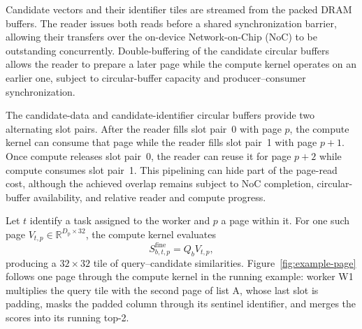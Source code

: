 Candidate vectors and their identifier tiles are streamed from the packed DRAM buffers. The reader issues both reads before a shared synchronization barrier, allowing their transfers over the on-device Network-on-Chip (NoC) to be outstanding concurrently. Double-buffering of the candidate circular buffers allows the reader to prepare a later page while the compute kernel operates on an earlier one, subject to circular-buffer capacity and producer--consumer synchronization.

The candidate-data and candidate-identifier circular buffers provide two alternating slot pairs. After the reader fills slot pair~0 with page \(p\), the compute kernel can consume that page while the reader fills slot pair~1 with page \(p+1\). Once compute releases slot pair~0, the reader can reuse it for page \(p+2\) while compute consumes slot pair~1. This pipelining can hide part of the page-read cost, although the achieved overlap remains subject to NoC completion, circular-buffer availability, and relative reader and compute progress.


Let \(t\) identify a task assigned to the worker and \(p\) a page within it. For one such page \(V_{t,p}\in\mathbb{R}^{D_{\mathrm{p}}\times32}\), the compute kernel evaluates
\begin{equation}
S^{\mathrm{fine}}_{b,t,p}=Q_bV_{t,p},
\label{eq:fine-search}
\end{equation}
producing a \(32\times32\) tile of query--candidate similarities. Figure~\ref{fig:example-page} follows one page through the compute kernel in the running example: worker W1 multiplies the query tile with the second page of list A, whose last slot is padding, masks the padded column through its sentinel identifier, and merges the scores into its running top-2.

